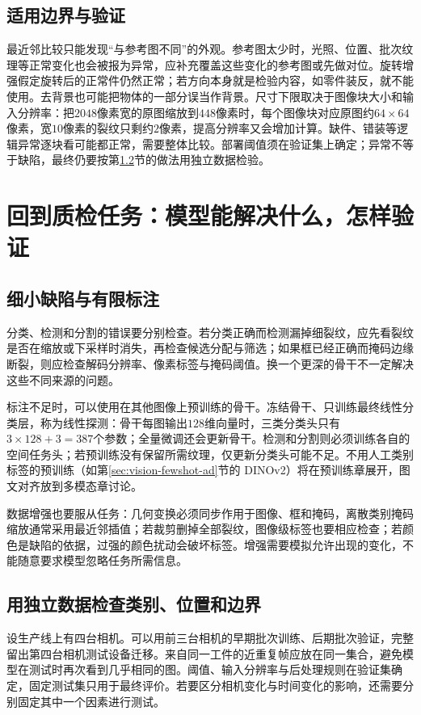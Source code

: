 \subsection{适用边界与验证}
最近邻比较只能发现“与参考图不同”的外观。参考图太少时，光照、位置、批次纹理等正常变化也会被报为异常，应补充覆盖这些变化的参考图或先做对位。旋转增强假定旋转后的正常件仍然正常；若方向本身就是检验内容，如零件装反，就不能使用。去背景也可能把物体的一部分误当作背景。尺寸下限取决于图像块大小和输入分辨率：把$2048$像素宽的原图缩放到$448$像素时，每个图像块对应原图约$64\times64$像素，宽$10$像素的裂纹只剩约$2$像素，提高分辨率又会增加计算。缺件、错装等逻辑异常逐块看可能都正常，需要整体比较。部署阈值须在验证集上确定；异常不等于缺陷，最终仍要按第\ref{sec:vision-validation}节的做法用独立数据检验。

\section{回到质检任务：模型能解决什么，怎样验证}
\subsection{细小缺陷与有限标注}
分类、检测和分割的错误要分别检查。若分类正确而检测漏掉细裂纹，应先看裂纹是否在缩放或下采样时消失，再检查候选分配与筛选；如果框已经正确而掩码边缘断裂，则应检查解码分辨率、像素标签与掩码阈值。换一个更深的骨干不一定解决这些不同来源的问题。

标注不足时，可以使用在其他图像上预训练的骨干。冻结骨干、只训练最终线性分类层，称为线性探测：骨干每图输出$128$维向量时，三类分类头只有$3\times128+3=387$个参数；全量微调还会更新骨干。检测和分割则必须训练各自的空间任务头；若预训练没有保留所需纹理，仅更新分类头可能不足。不用人工类别标签的预训练（如第\ref{sec:vision-fewshot-ad}节的 DINOv2）将在预训练章展开，图文对齐放到多模态章讨论。

数据增强也要服从任务：几何变换必须同步作用于图像、框和掩码，离散类别掩码缩放通常采用最近邻插值；若裁剪删掉全部裂纹，图像级标签也要相应检查；若颜色是缺陷的依据，过强的颜色扰动会破坏标签。增强需要模拟允许出现的变化，不能随意要求模型忽略任务所需信息。

\subsection{用独立数据检查类别、位置和边界}
\label{sec:vision-validation}
设生产线上有四台相机。可以用前三台相机的早期批次训练、后期批次验证，完整留出第四台相机测试设备迁移。来自同一工件的近重复帧应放在同一集合，避免模型在测试时再次看到几乎相同的图。阈值、输入分辨率与后处理规则在验证集确定，固定测试集只用于最终评价。若要区分相机变化与时间变化的影响，还需要分别固定其中一个因素进行测试。

